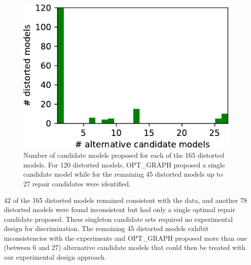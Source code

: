 \begin{figure}[h]
\begin{center}
\includegraphics[scale=0.9,keepaspectratio=true]{./figures/histogram.pdf}
\end{center}
\caption{
 Number of candidate models proposed for each of the 165 distorted models.
 For 120 distorted models, OPT\_GRAPH proposed a single candidate model
 while for the remaining 45 distorted models up to 27 repair candidates were identified.
}

\label{fig:candidates}
\end{figure}

42 of the 165 distorted models remained consistent with the data,
and another 78 distorted models were found inconsistent but had only a single optimal repair candidate proposed.
These singleton candidate sets required no experimental design for discrimination.
The remaining 45 distorted models exhibit inconsistencies with the experiments and OPT\_GRAPH proposed
more than one (between 6 and 27) alternative candidate models
that could then be treated with our experimental design approach.

